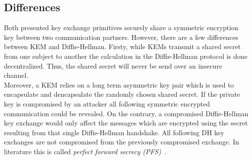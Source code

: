 \subsection{Differences}
Both presented key exchange primitives securely share a symmetric encryption key between two communication partners. However, there are a few differences between KEM and Diffie-Hellman. Firsty, while KEMs transmit a shared secret from one subject to another the calculation in the Diffie-Hellman protocol is done decentralized. Thus, the shared secret will never be send over an insecure channel.\\
Moreover, a KEM relies on a long term asymmetric key pair which is used to encapsulate and dencapsulate the randomly chosen shared secret. If the private key is compromised by an attacker all following symmetric encrypted communication could be revealed. On the contrary, a compromised Diffie-Hellman key exchange would only affect the messages which are encrypted using the secret resulting from that single Diffie-Hellman handshake. All following DH key exchanges are not compromised from the previously compromised exchange. In literature this is called \textit{perfect forward secrecy (PFS)}~\parencite{ITSicherheit}.

